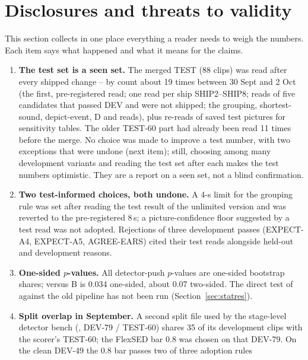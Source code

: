 \section{Disclosures and threats to validity}\label{sec:disclosures}

This section collects in one place everything a reader needs to weigh the numbers. Each item says what happened and
what it means for the claims.

\begin{enumerate}[label=\textbf{D\arabic*.}, leftmargin=*]
  \item \textbf{The test set is a seen set.} The merged TEST (88 clips) was read after every shipped change -- by
        count about 19 times between 30 Sept and 2 Oct (the first, pre-registered read; one read per ship SHIP2--SHIP8;
        reads of five candidates that passed DEV and were not shipped; the grouping, shortest-sound, depict-event, D
        and \Dp{} reads), plus re-reads of saved test pictures for sensitivity tables. The older TEST-60 part had already
        been read 11 times before the merge. No choice was made to improve a test number, with two exceptions that were
        undone (next item); still, choosing among many development variants and reading the test set after each makes
        the test numbers optimistic. They are a report on a seen set, not a blind confirmation.
  \item \textbf{Two test-informed choices, both undone.} A 4-s limit for the grouping rule was set after reading the
        test result of the unlimited version and was reverted to the pre-registered 8\,s; a picture-confidence floor
        suggested by a test read was not adopted. Rejections of three development passes (EXPECT-A4, EXPECT-A5,
        AGREE-EARS) cited their test reads alongside held-out and development reasons.
  \item \textbf{One-sided $p$-values.} All detector-push $p$-values are one-sided bootstrap shares; \Dp{} versus B is
        0.034 one-sided, about 0.07 two-sided. The direct test of \Dp{} against the old pipeline has not been run
        (Section~\ref{sec:statres}).
  \item \textbf{Split overlap in September.} A second split file used by the stage-level detector bench
        (, DEV-79 / TEST-60) shares 35 of its development clips with the scorer's TEST-60;
        the FlexSED bar 0.8 was chosen on that DEV-79. On the clean DEV-49 the 0.8 bar passes two of three adoption rules

\end{enumerate}
